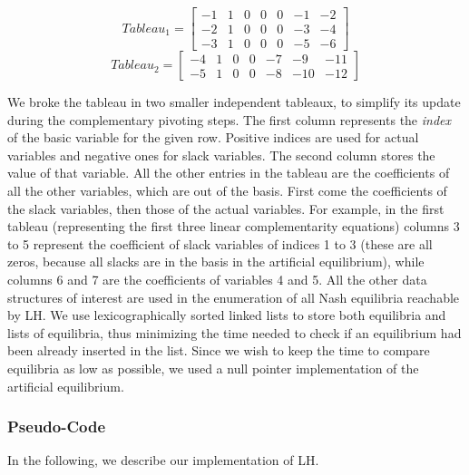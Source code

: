 \documentclass[11pt]{article}
\begin{document}
\begin{equation*}
Tableau_1 = \left[
  \begin{array}{ccccccc}
    -1 & 1 & 0 & 0 & 0 & -1 & -2\\
    -2 & 1 & 0 & 0 & 0 & -3 & -4\\
    -3 & 1 & 0 & 0 & 0 & -5 & -6
  \end{array}
\right]
\end{equation*}
\begin{equation*}
Tableau_2 = \left[
  \begin{array}{ccccccc}
    -4 & 1 & 0 & 0 & -7 & -9 & -11\\
    -5 & 1 & 0 & 0 & -8 & -10 & -12
  \end{array}
\right]
\end{equation*}

We broke the tableau in two smaller independent tableaux, to
simplify its update during the complementary pivoting steps. The
first column represents the {\it index} of the basic variable for
the given row. Positive indices are used for actual variables and
negative ones for slack variables. The second column stores the
value of that variable. All the other entries in the tableau are the
coefficients of all the other variables, which are out of the basis.
First come the coefficients of the slack variables, then those of
the actual variables. For example, in the first tableau
(representing the first three linear complementarity equations)
columns 3 to 5 represent the coefficient of slack variables of
indices 1 to 3 (these are all zeros, because all slacks are in the
basis in the artificial equilibrium), while columns 6 and 7 are the
coefficients of variables 4 and 5. All the other data structures of
interest are used in the enumeration of all Nash equilibria
reachable by LH. We use lexicographically sorted linked lists to
store both equilibria and lists of equilibria, thus minimizing the
time needed to check if an equilibrium had been already inserted in
the list. Since we wish to keep the time to compare equilibria as
low as possible, we used a null pointer implementation of the
artificial equilibrium.

\subsubsection{Pseudo-Code}

In the following, we describe our implementation of LH.
\end{document}

